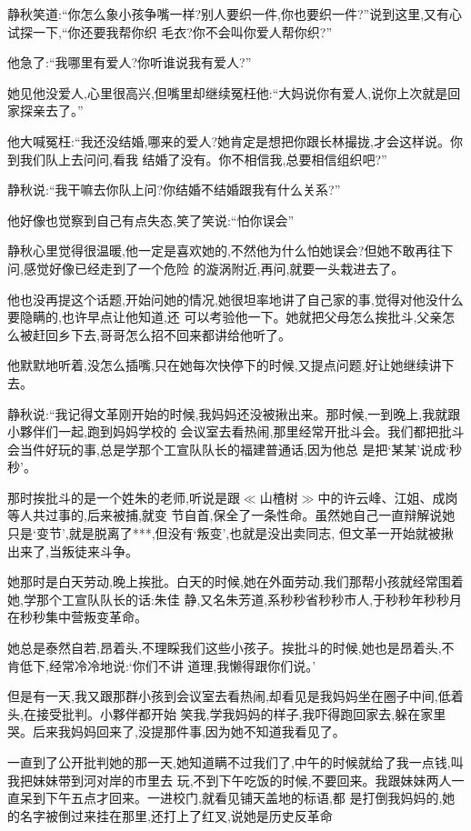 ﻿\documentclass[12pt]{article}
\begin{document}
静秋笑道:``你怎么象小孩争嘴一样?别人要织一件,你也要织一件?''说到这里,又有心试探一下,``你还要我帮你织
毛衣?你不会叫你\myrule 爱人\myrule 帮你织?''

他急了:``我哪里有爱人?你听谁说我有爱人?''

她见他没爱人,心里很高兴,但嘴里却继续冤枉他:``大妈说你\myrule 有爱人,说你上次就是回家探亲去了。''

他大喊冤枉:``我还没结婚,哪来的爱人?她肯定是想把你跟长林撮拢,才会这样说。你到我们队上去问问,看我
\myrule 结婚了没有\myrule 。你不相信我,总要相信组织吧?''

静秋说:``我干嘛去你队上问?你\myrule 结婚不结婚\myrule 跟我有什么关系?''

他好像也觉察到自己有点失态,笑了笑说:``怕你\myrule 误会\myrule ''

静秋心里觉得很温暖,他一定是喜欢她的,不然他为什么怕她误会?但她不敢再往下问,感觉好像已经走到了一个危险
的漩涡附近,再问,就要一头栽进去了。

他也没再提这个话题,开始问她的情况,她很坦率地讲了自己家的事,觉得对他没什么要隐瞒的,也许早点让他知道,还
可以考验他一下。她就把父母怎么挨批斗,父亲怎么被赶回乡下去,哥哥怎么招不回来都讲给他听了。

他默默地听着,没怎么插嘴,只在她每次快停下的时候,又提点问题,好让她继续讲下去。

静秋说:``我记得文革刚开始的时候,我妈妈还没被揪出来。那时候,一到晚上,我就跟小夥伴们一起,跑到妈妈学校的
会议室去看热闹,那里经常开批斗会。我们都把批斗会当件好玩的事,总是学那个工宣队队长的福建普通话,因为他总
是把`某某'说成`秒秒'。

那时挨批斗的是一个姓朱的老师,听说是跟$\ll$山楂树$\gg$中的许云峰、江姐、成岗等人共过事的,后来被捕,就变
节自首,保全了一条性命。虽然她自己一直辩解说她只是`变节',就是脱离了***,但没有`叛变',也就是没出卖同志,
但文革一开始就被揪出来了,当叛徒来斗争。

她那时是白天劳动,晚上挨批。白天的时候,她在外面劳动,我们那帮小孩就经常围着她,学那个工宣队队长的话:朱佳
静,又名朱芳道,系秒秒省秒秒市人,于秒秒年秒秒月在秒秒集中营叛变革命。

她总是泰然自若,昂着头,不理睬我们这些小孩子。挨批斗的时候,她也是昂着头,不肯低下,经常冷冷地说:`你们不讲
道理,我懒得跟你们说。'

但是有一天,我又跟那群小孩到会议室去看热闹,却看见是我妈妈坐在圈子中间,低着头,在接受批判。小夥伴都开始
笑我,学我妈妈的样子,我吓得跑回家去,躲在家里哭。后来我妈妈回来了,没提那件事,因为她不知道我看见了。

一直到了公开批判她的那一天,她知道瞒不过我们了,中午的时候就给了我一点钱,叫我把妹妹带到河对岸的市里去
玩,不到下午吃饭的时候,不要回来。我跟妹妹两人一直呆到下午五点才回来。一进校门,就看见铺天盖地的标语,都
是打倒我妈妈的,她的名字被倒过来挂在那里,还打上了红叉,说她是历史反革命\myrule 
\end{document}
